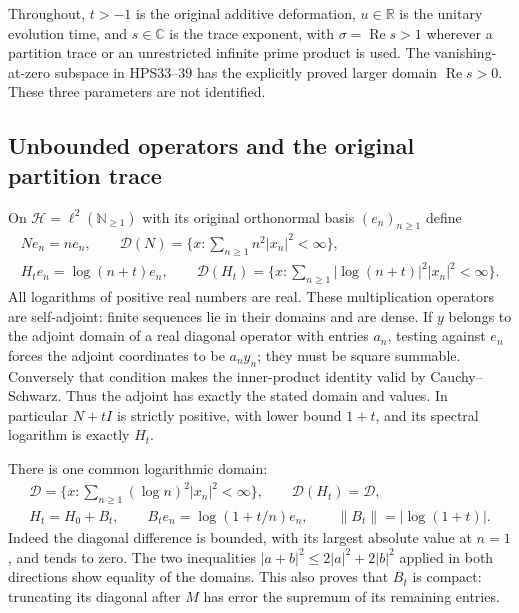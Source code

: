 Throughout, $t>-1$ is the original additive deformation,
$u\in\mathbb R$ is the unitary evolution time, and
$s\in\mathbb C$ is the trace exponent, with
$\sigma=\operatorname{Re}s>1$ wherever a partition trace
or an unrestricted infinite prime product is used.
The vanishing-at-zero subspace in HPS33--39 has
the explicitly proved larger domain $\operatorname{Re}s>0$.
These three parameters
are not identified.

\subsection{Unbounded operators and the original partition trace}

On $\mathcal H=\ell^2(\mathbb N_{\ge1})$ with its original
orthonormal basis $(e_n)_{n\ge1}$ define
\begin{equation}\tag{HPS1}
\begin{gathered}
 Ne_n=ne_n,\qquad
 \mathcal D(N)=\{x:\sum_{n\ge1}n^2|x_n|^2<\infty\},\\
 H_te_n=\log(n+t)e_n,\qquad
 \mathcal D(H_t)=\{x:\sum_{n\ge1}|\log(n+t)|^2|x_n|^2<\infty\}.
\end{gathered}
\end{equation}
All logarithms of positive real numbers are real.
These multiplication operators are self-adjoint:
finite sequences lie in their domains and are dense.
If $y$ belongs to the adjoint domain of a real diagonal
operator with entries $a_n$, testing against $e_n$
forces the adjoint coordinates to be $a_ny_n$; they
must be square summable. Conversely that condition
makes the inner-product identity valid by
Cauchy--Schwarz. Thus the adjoint has exactly the
stated domain and values. In particular $N+tI$ is
strictly positive, with lower bound $1+t$, and its
spectral logarithm is exactly $H_t$.

There is one common logarithmic domain:
\begin{equation}\tag{HPS2}
\begin{gathered}
 \mathcal D=\{x:\sum_{n\ge1}(\log n)^2|x_n|^2<\infty\},
 \qquad \mathcal D(H_t)=\mathcal D,\\
 H_t=H_0+B_t,\qquad
 B_te_n=\log(1+t/n)e_n,\qquad
 \|B_t\|=|\log(1+t)| .
\end{gathered}
\end{equation}
Indeed the diagonal difference is bounded, with its
largest absolute value at $n=1$, and tends to zero.
The two inequalities
$|a+b|^2\le2|a|^2+2|b|^2$ applied in both directions
show equality of the domains. This also proves that
$B_t$ is compact: truncating its diagonal after $M$
has error the supremum of its remaining entries.

